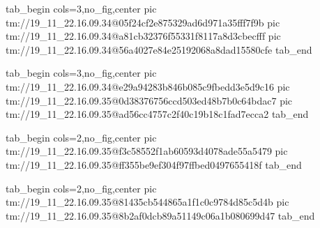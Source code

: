  
 
 
 
 

\qqSecCmtScr


\ifcmt
  tab_begin cols=3,no_fig,center
    pic tm://19_11_22.16.09.34@05f24cf2e875329ad6d971a35fff7f9b
    pic tm://19_11_22.16.09.34@a81cb32376f55331f8117a8d3cbecfff
    pic tm://19_11_22.16.09.34@56a4027e84e25192068a8dad15580cfe
  tab_end
\fi


\ifcmt
  tab_begin cols=3,no_fig,center
    pic tm://19_11_22.16.09.34@e29a94283b846b085c9fbedd3e5d9c16
    pic tm://19_11_22.16.09.35@0d38376756ccd503ed48b7b0c64bdac7
    pic tm://19_11_22.16.09.35@ad56cc4757c2f40c19b18c1fad7ecca2
  tab_end
\fi


\ifcmt
  tab_begin cols=2,no_fig,center
    pic tm://19_11_22.16.09.35@f3c58552f1ab60593d4078ade55a5479
    pic tm://19_11_22.16.09.35@ff355be9ef304f97ffbed0497655418f
  tab_end
\fi


\ifcmt
  tab_begin cols=2,no_fig,center
    pic tm://19_11_22.16.09.35@81435cb544865a1f1c0c9784d85c5d4b
    pic tm://19_11_22.16.09.35@8b2af0dcb89a51149c06a1b080699d47
  tab_end
\fi

